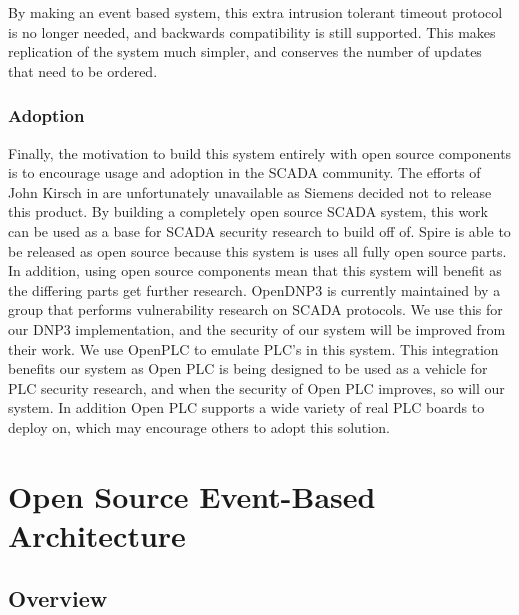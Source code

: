 \documentclass[11pt,a4paper,oldfontcommands]{memoir}
\begin{document}
\indent
By making an event based system, this extra intrusion tolerant timeout protocol is no
longer needed, and backwards compatibility is still supported. This makes replication
of the system much simpler, and conserves the number of updates that need to be ordered.\\


\subsection{Adoption}

\indent \indent

Finally, the motivation to build this system entirely with open source components is
to encourage usage and adoption in the SCADA community. The efforts of John Kirsch in
\cite{Survivable SCADA via Intrusion-Tolerant Replication} are unfortunately unavailable
as Siemens decided not to release this product. By building a completely open source
SCADA system, this work can be used as a base for SCADA security research to build off
of. Spire is able to be released as open source because this system is uses all
fully open source parts. \\

\indent 
In addition, using open source components mean that this
system will benefit as the differing parts get further research. OpenDNP3 \cite{OpenDNP3}
is currently maintained by a group that performs vulnerability research on SCADA
protocols. We use this for our DNP3 implementation, and the security of our
system will be improved from their work. We use OpenPLC \cite{OpenPLC} to emulate PLC's 
in this system. This integration benefits our system as Open PLC is being designed to
be used as a vehicle for PLC security research, and when the security of Open PLC improves,
so will our system. In addition Open PLC supports a wide variety of real PLC
boards to deploy on, which may encourage others to adopt this solution.\\

\chapter{Open Source Event-Based Architecture}

\section{Overview}
\end{document}
